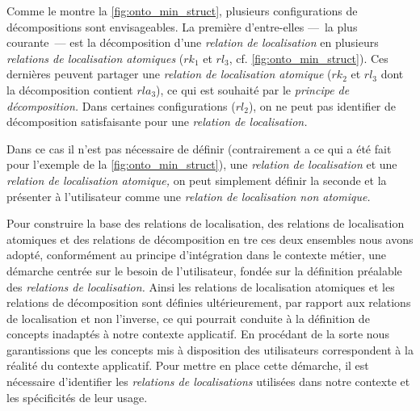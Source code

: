 Comme le montre la \autoref{fig:onto_min_struct}, plusieurs
configurations de décompositions sont envisageables. La première
d'entre-elles ---~la plus courante~--- est la décomposition d'une
\emph{relation de localisation} en plusieurs \emph{relations de
  localisation atomiques} (\eg \(rk_1\) et \(rl_3\),
cf. \autoref{fig:onto_min_struct}).
%
Ces dernières peuvent partager une \emph{relation de localisation
  atomique} (\eg \(rk_2\) et \(rl_3\) dont la décomposition contient
\(rla_3\)), ce qui est souhaité par le \emph{principe de
  décomposition.}
%
Dans certaines configurations (\eg \(rl_2\)), on ne peut pas
identifier de décomposition satisfaisante pour une \emph{relation de
  localisation.}


Dans ce cas il
n'est pas nécessaire de définir (contrairement a ce qui a été fait
pour l'exemple de la \autoref{fig:onto_min_struct}), une
\emph{relation de localisation} et une \emph{relation de localisation
  atomique,} on peut simplement définir la seconde et la présenter à
l'utilisateur comme une \emph{relation de localisation non atomique.}

Pour construire la base des relations de localisation, des relations
de localisation atomiques et des relations de décomposition en tre ces
deux ensembles nous avons adopté, conformément au principe
d'intégration dans le contexte métier, une démarche centrée sur le
besoin de l'utilisateur, \ie fondée sur la définition préalable des
\emph{relations de localisation.} Ainsi les relations de localisation
atomiques et les relations de décomposition sont définies
ultérieurement, par rapport aux relations de localisation et non
l'inverse, ce qui pourrait conduite à la définition de concepts
inadaptés à notre contexte applicatif.  En procédant de la sorte nous
garantissions que les concepts mis à disposition des utilisateurs
correspondent à la réalité du contexte applicatif. Pour mettre en
place cette démarche, il est nécessaire d'identifier les
\emph{relations de localisations} utilisées dans notre contexte et les
spécificités de leur usage.


